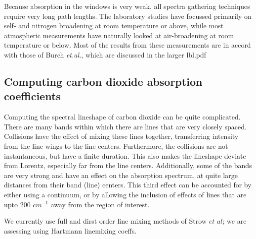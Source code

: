 \documentclass[11pt]{article}
\begin{document}
Because absorption in the windows is very weak, all spectra gathering 
techniques require very long path lengths.  The laboratory studies have 
focussed primarily on self- and nitrogen broadening at room temperature or 
above, while most atmospheric measurements have naturally looked at 
air-broadening at room temperature or below.  Most of the results from 
these measurements are in accord with
those of Burch {\it et.al.}, which are discussed in the larger lbl.pdf

\subsection{Computing carbon dioxide absorption coefficients}

Computing the spectral lineshape of carbon dioxide can be quite complicated.
There are many bands within which there are lines that are very closely 
spaced. Collisions have the effect of mixing these lines together,
transferring intensity from the line wings to the line centers. Furthermore,
the  collisions are not instantaneous, but have a finite duration. This 
also makes the lineshape deviate from Lorentz, especially far from the line
centers. Additionally, some of the bands are very strong and have an 
effect on the absorption spectrum, at
quite large distances from their band (line) centers. This third effect can
be accounted for by either using a continuum, or by allowing the inclusion
of effects of lines that are upto 200 $cm^{-1}$ away from the region of 
interest.

We currently use full and dirst order line mixing methods of Strow $et$ $al$;
we are assessing using Hartmann linemixing coeffs.

\newpage



%

\end{document}
